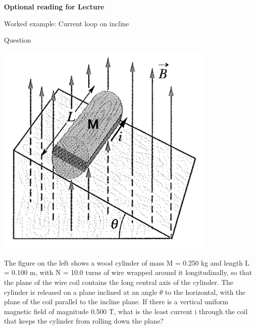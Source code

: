 
\begin{frame}[plain,c]
\begin{center}
{\Huge \bf Optional reading for Lecture \thislecture}
\end{center}
\end{frame}


%
%

{
\problemslide

%
%
%

\begin{frame}{Worked example: Current loop on incline}

  \begin{blockexmplque}{Question}
    \begin{minipage}[l]{0.37\textwidth}
     \begin{center}
         \includegraphics[width=0.80\textwidth]{./images/problems/lect06_cylinder_on_incline}
     \end{center}
    \end{minipage}
    \begin{minipage}[r]{0.60\textwidth}
    	The figure on the left shows a wood cylinder of mass M = 0.250 kg and length
    	L = 0.100 m, with N = 10.0 turns of wire wrapped around it longitudinally,
    	so that the plane of the wire coil contains the long central axis of the cylinder.
    	The cylinder is released on a plane inclined at an angle $\theta$ to the horizontal,
    	with the plane of the coil parallel to the incline plane. If there is a vertical
    	uniform magnetic field of magnitude 0.500 T, what is the least current i through
    	the coil that keeps the cylinder from rolling down the plane?
    \end{minipage}
  \end{blockexmplque}


\end{frame}}

